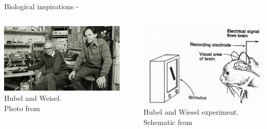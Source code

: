 \begin{frame}[t,allowframebreaks]{Biological inspirations - }
    \begin{columns}
        \begin{column}{0.55\textwidth}
            \begin{center}
            \includegraphics[width=0.9\textwidth]
                {./images/people/hubel_and_weisel.png}\\
            {\scriptsize 
            Hubel and Weisel.\\
            \color{col:attribution} 
            Photo from \cite{HarvardBrainTour:HubelAndWiesel}}\\
            \end{center}
        \end{column}
        \begin{column}{0.40\textwidth}
            \begin{center}
            \includegraphics[width=1.0\textwidth]
                {./images/biological_inspirations/hubel_wiesel_experiment.png}\\
            {\scriptsize 
            Hubel and Wiesel experiment.\\
            \color{col:attribution} 
            Schematic from \cite{GoodPsychology:HubelAndWiesel}}\\
            \end{center}
        \end{column}
    \end{columns}



\end{frame}
